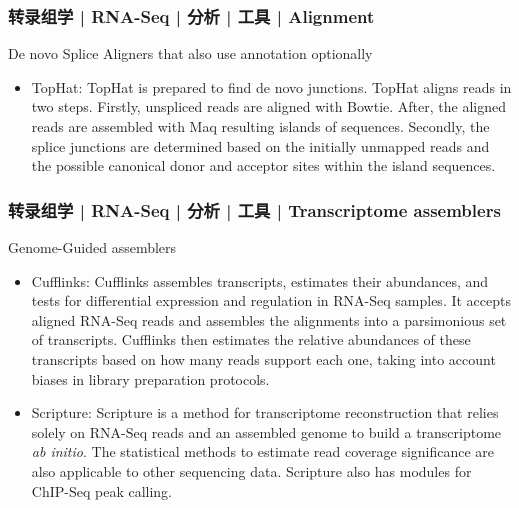 \begin{frame}
  \frametitle{转录组学 | RNA-Seq | 分析 | 工具 | Alignment}
  \begin{block}{De novo Splice Aligners that also use annotation optionally}
    \begin{itemize}
      \item TopHat: TopHat is prepared to find de novo junctions. TopHat aligns reads in two steps. Firstly, unspliced reads are aligned with Bowtie. After, the aligned reads are assembled with Maq resulting islands of sequences. Secondly, the splice junctions are determined based on the initially unmapped reads and the possible canonical donor and acceptor sites within the island sequences.
    \end{itemize}
  \end{block}
\end{frame}

\begin{frame}
  \frametitle{转录组学 | RNA-Seq | 分析 | 工具 | Transcriptome assemblers}
  \begin{block}{Genome-Guided assemblers}
    \begin{itemize}
      \item Cufflinks: Cufflinks assembles transcripts, estimates their abundances, and tests for differential expression and regulation in RNA-Seq samples. It accepts aligned RNA-Seq reads and assembles the alignments into a parsimonious set of transcripts. Cufflinks then estimates the relative abundances of these transcripts based on how many reads support each one, taking into account biases in library preparation protocols.
      \item Scripture: Scripture is a method for transcriptome reconstruction that relies solely on RNA-Seq reads and an assembled genome to build a transcriptome \textit{ab initio}. The statistical methods to estimate read coverage significance are also applicable to other sequencing data. Scripture also has modules for ChIP-Seq peak calling.
    \end{itemize}
  \end{block}
\end{frame}

